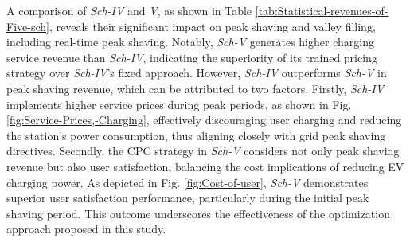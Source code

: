 \documentclass[preprint,12pt]{elsarticle}
\begin{document}

A comparison of \emph{Sch-IV} and \emph{V}, as shown in Table \ref{tab:Statistical-revenues-of-Five-sch}, reveals their significant impact on peak shaving and valley filling, including real-time peak shaving.  Notably, \emph{Sch-V} generates higher charging service revenue than \emph{Sch-IV}, indicating the superiority of its trained pricing strategy over \emph{Sch-IV}'s fixed approach. However, \emph{Sch-IV} outperforms \emph{Sch-V} in peak shaving revenue, which can be attributed to two factors. Firstly, \emph{Sch-IV} implements higher service prices during peak periods, as shown in Fig.  \ref{fig:Service-Prices,-Charging}, effectively discouraging user charging and reducing the station's power consumption, thus aligning closely with grid peak shaving directives. Secondly, the CPC strategy in \emph{Sch-V} considers not only peak shaving revenue but also user satisfaction, balancing the cost implications of reducing EV charging power.  As depicted in Fig. \ref{fig:Cost-of-user}, \emph{Sch-V} demonstrates superior user satisfaction performance, particularly during the initial peak shaving period. This outcome underscores the effectiveness of the optimization approach proposed in this study.
\end{document}
